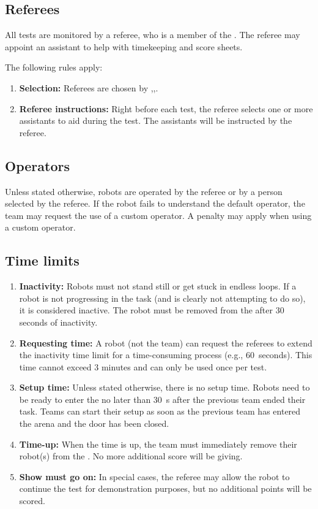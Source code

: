 \subsection{Referees}\label{rule:referees}
All tests are monitored by a referee, who is a member of the \TC{}. The referee may appoint an assistant to help with timekeeping and score sheets.

The following rules apply:
\begin{enumerate}
	\item \textbf{Selection:} Referees are chosen by \EC{},\TC{},\OC{}.

	\item \textbf{Referee instructions:} Right before each test, the referee selects one or more assistants to aid during the test. The assistants will be instructed by the referee.
\end{enumerate}


\subsection{Operators}\label{rule:operator}
Unless stated otherwise, robots are operated by the referee or by a person selected by the referee.
If the robot fails to understand the default operator, the team may request the use of a custom operator.
A penalty may apply when using a custom operator.


\subsection{Time limits}\label{rule:time_limits}
\begin{enumerate}
	\item \textbf{Inactivity:} Robots must not stand still or get stuck in endless loops.
	If a robot is not progressing in the task (and is clearly not attempting to do so), it is considered inactive.
	The robot must be removed from the \Arena{} after 30 seconds of inactivity.

	\item \textbf{Requesting time:} A robot (not the team) can request the referees to extend the inactivity time limit for a time-consuming process (e.g., 60~seconds). This time cannot exceed 3 minutes and can only be used once per test.

	\item \textbf{Setup time:} Unless stated otherwise, there is no setup time.
	Robots need to be ready to enter the \Arena{} no later than \SI{30}{\second} after the previous team ended their task. Teams can start their setup as soon as the previous team has entered the arena and the door has been closed.

	\item \textbf{Time-up:} When the time is up, the team must immediately remove their robot(s) from the  \Arena{}.
	No more additional score will be giving.

	\item \textbf{Show must go on:} In special cases, the referee may allow the robot to continue the test for demonstration purposes, but no additional points will be scored.
\end{enumerate}
